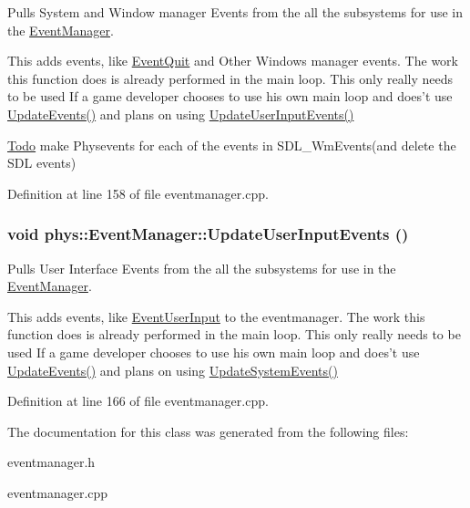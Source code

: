 Pulls System and Window manager Events from the all the subsystems for use in the \hyperlink{classphys_1_1EventManager}{EventManager}. 

This adds events, like \hyperlink{classphys_1_1EventQuit}{EventQuit} and Other Windows manager events. The work this function does is already performed in the main loop. This only really needs to be used If a game developer chooses to use his own main loop and does't use \hyperlink{classphys_1_1EventManager_a63cf23dc9fe0ced3e2c60ca61c97b166}{UpdateEvents()} and plans on using \hyperlink{classphys_1_1EventManager_a01a5a131ac26679eee5dcf5dd514045c}{UpdateUserInputEvents()} 

\begin{Desc}
\item[\hyperlink{todo__todo000006}{Todo}]make Physevents for each of the events in SDL\_\-WmEvents(and delete the SDL events) \end{Desc}




Definition at line 158 of file eventmanager.cpp.

\hypertarget{classphys_1_1EventManager_a01a5a131ac26679eee5dcf5dd514045c}{
\subsubsection[{UpdateUserInputEvents}]{\setlength{\rightskip}{0pt plus 5cm}void phys::EventManager::UpdateUserInputEvents ()}}
\label{da/dde/classphys_1_1EventManager_a01a5a131ac26679eee5dcf5dd514045c}


Pulls User Interface Events from the all the subsystems for use in the \hyperlink{classphys_1_1EventManager}{EventManager}. 

This adds events, like \hyperlink{classphys_1_1EventUserInput}{EventUserInput} to the eventmanager. The work this function does is already performed in the main loop. This only really needs to be used If a game developer chooses to use his own main loop and does't use \hyperlink{classphys_1_1EventManager_a63cf23dc9fe0ced3e2c60ca61c97b166}{UpdateEvents()} and plans on using \hyperlink{classphys_1_1EventManager_a0cf574c55def063d66d7db46a4d3e8a5}{UpdateSystemEvents()} 

Definition at line 166 of file eventmanager.cpp.



The documentation for this class was generated from the following files:\begin{DoxyCompactItemize}
\item 
eventmanager.h\item 
eventmanager.cpp\end{DoxyCompactItemize}
